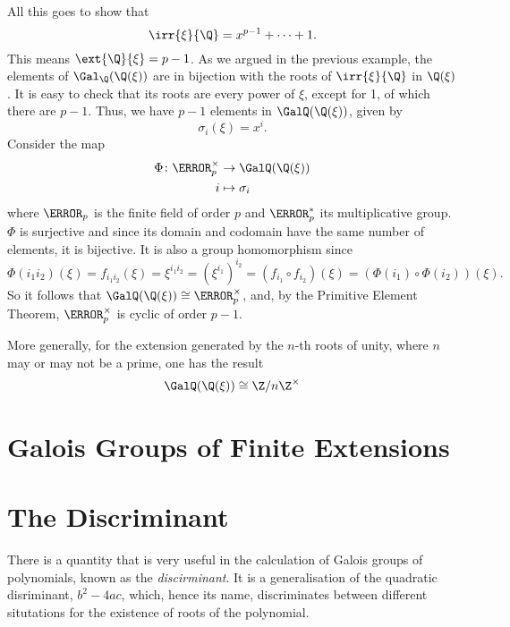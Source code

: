 \documentclass[12pt,oneside]{book}
\begin{document}
\begin{example}
	All this goes to show that
	\begin{equation*}
		\irr{\xi}{\Q} = x^{p-1} + \cdots + 1.
	\end{equation*}
	This means \( \ext{\Q}{\xi} = p-1 \).  As we argued in the previous example, the
	elements of \( \Gal_\Q(\Q(\xi)) \) are in bijection with the roots of \( \irr{\xi}{\Q}
	\) in \( \Q(\xi) \). It is easy to check that its roots are every power of \( \xi \),
	except for 1, of which there are \( p-1 \). Thus, we have \( p-1 \) elements in	\(
	\GalQ(\Q(\xi)) \), given by
	\begin{equation*}
		\sigma_i(\xi) = x^i.
	\end{equation*}
	Consider the map
	\begin{align*}
		\Phi \colon \F_p^{\times} & \to \GalQ(\Q(\xi)) \\
		i & \mapsto \sigma_i
	\end{align*}
	where \( \F_p \) is the finite field of order \( p \) and \( \F_p^{\ast} \) its
	multiplicative group. \( \Phi \) is surjective and since its domain and codomain have
	the same number of elements, it is bijective. It is also a group homomorphism since
	\begin{equation*}
		\Phi(i_1 i_2)(\xi) = f_{i_1i_2}(\xi) = \xi^{i_1 i_2} = (\xi^{i_1})^{i_2} = (f_{i_1}
		\circ f_{i_2})(\xi) = (\Phi(i_1)\circ\Phi(i_2))(\xi).
	\end{equation*}
	So it follows that \( \GalQ(\Q(\xi)) \cong \F_p^{\times} \), and, by the Primitive
	Element Theorem, \( \F_p^{\times} \) is cyclic of order \( p-1 \). 
	
 	More generally, for the extension generated by the \( n \)-th roots of unity, where \( n
 	\) may or may not be a prime, one has the result
 	\begin{equation*}
 		\GalQ(\Q(\xi)) \cong \Z/n\Z^{\times}
 	\end{equation*}
 	



\end{example}

\section{Galois Groups of Finite Extensions}



\section{The Discriminant}
There is a quantity that is very useful in the calculation of Galois groups of
polynomials, known as the \emph{discirminant}. It is a generalisation of the quadratic
disriminant, \( b^2 - 4ac \), which, hence its name, discriminates between different
situtations for the existence of roots of the polynomial.
\end{document}
